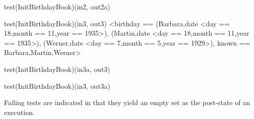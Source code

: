 \documentclass{article}
\begin{document}
\begin{zexecexpr}
 test(InitBirthdayBook)(in2, out2a) 
\yields
{}
\end{zexecexpr}

\begin{zexecexpr}
 test(InitBirthdayBook)(in3, out3) 
\yields
{<birthday ==
   {(Barbara,date <day == 18,month == 11,year == 1935>),
    (Martin,date <day == 18,month == 11,year == 1935>),
    (Werner,date <day == 7,month == 5,year == 1929>)},
  known == {Barbara,Martin,Werner}>}
\end{zexecexpr}

\begin{zexecexpr}
 test(InitBirthdayBook)(in3a, out3) 
\yields
{}
\end{zexecexpr}

\begin{zexecexpr}
 test(InitBirthdayBook)(in3, out3a) 
\yields
{}
\end{zexecexpr}

Failing tests are indicated in that they yield an empty set as the
post-state of an execution.
\end{document}
